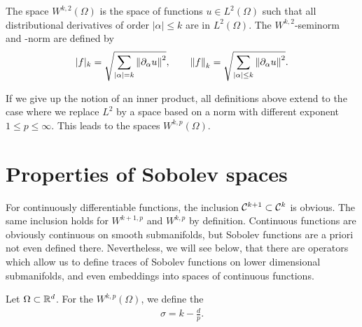 \begin{definition}
  The space $W^{k,2}(\Omega)$ is the space of functions $u\in
  L^2(\Omega)$ such that all distributional derivatives of order
  $|\alpha| \le k$ are in $L^2(\Omega)$. The $W^{k,2}$-seminorm and
  -norm are defined by
  \begin{gather*}
    |f|_k = \sqrt{\sum_{|\alpha| = k} \left\|\partial_\alpha u\right\|^2},
    \qquad
    \left\|f\right\|_k = \sqrt{\sum_{|\alpha| \le k} \left\|\partial_\alpha u\right\|^2}.
  \end{gather*}
\end{definition}

\begin{remark}
  If we give up the notion of an inner product, all definitions above
  extend to the case where we replace $L^2$ by a space based on a norm
  with different exponent $1 \le p \le \infty$. This leads to the
  spaces $W^{k,p}(\Omega)$.
\end{remark}
\section{Properties of Sobolev spaces}
\label{sec:hk:properties}

\begin{intro}
  For continuously differentiable functions, the inclusion $\mathcal C^{k+1}
  \subset \mathcal C^k$ is obvious. The same inclusion holds for $W^{k+1,p}$
  and $W^{k,p}$ by definition. Continuous functions are obviously
  continuous on smooth submanifolds, but Sobolev functions are a
  priori not even defined there. Nevertheless, we will see below, that
  there are operators which allow us to define traces of Sobolev
  functions on lower dimensional submanifolds, and even embeddings
  into spaces of continuous functions.
\end{intro}

\begin{definition}
  Let $\Omega \subset \mathbb R^d$. For the 
  $W^{k,p}(\Omega)$, we define the 
  \begin{gather}
    \label{eq:hk:3}
    \sigma = k - \frac dp.
  \end{gather}
\end{definition}


